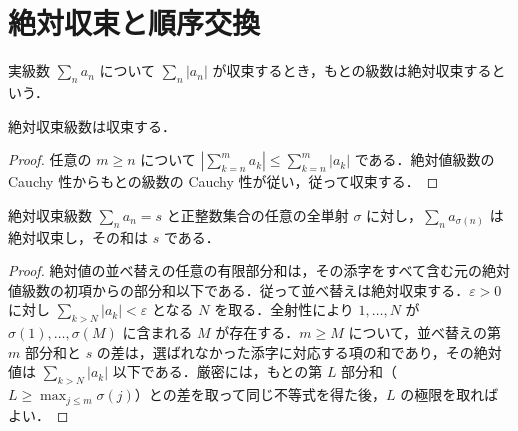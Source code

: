 \section{絶対収束と順序交換}
\begin{defn}[絶対収束]
実級数 $\sum_n a_n$ について $\sum_n|a_n|$ が収束するとき，もとの級数は絶対収束するという．
\end{defn}
\begin{prop}[絶対収束級数の収束]
絶対収束級数は収束する．
\end{prop}
\begin{proof}
任意の $m\geq n$ について $\left|\sum_{k=n}^m a_k\right|\leq\sum_{k=n}^m |a_k|$ である．絶対値級数の Cauchy 性からもとの級数の Cauchy 性が従い，従って収束する．
\end{proof}
\begin{prop}[絶対収束級数の並べ替え]
絶対収束級数 $\sum_n a_n=s$ と正整数集合の任意の全単射 $\sigma$ に対し，$\sum_n a_{\sigma(n)}$ は絶対収束し，その和は $s$ である．
\end{prop}
\begin{proof}
絶対値の並べ替えの任意の有限部分和は，その添字をすべて含む元の絶対値級数の初項からの部分和以下である．従って並べ替えは絶対収束する．$\varepsilon>0$ に対し $\sum_{k>N}|a_k|<\varepsilon$ となる $N$ を取る．全射性により $1,\ldots,N$ が $\sigma(1),\ldots,\sigma(M)$ に含まれる $M$ が存在する．$m\geq M$ について，並べ替えの第 $m$ 部分和と $s$ の差は，選ばれなかった添字に対応する項の和であり，その絶対値は $\sum_{k>N}|a_k|$ 以下である．厳密には，もとの第 $L$ 部分和（$L\geq\max_{j\leq m}\sigma(j)$）との差を取って同じ不等式を得た後，$L$ の極限を取ればよい．
\end{proof}
